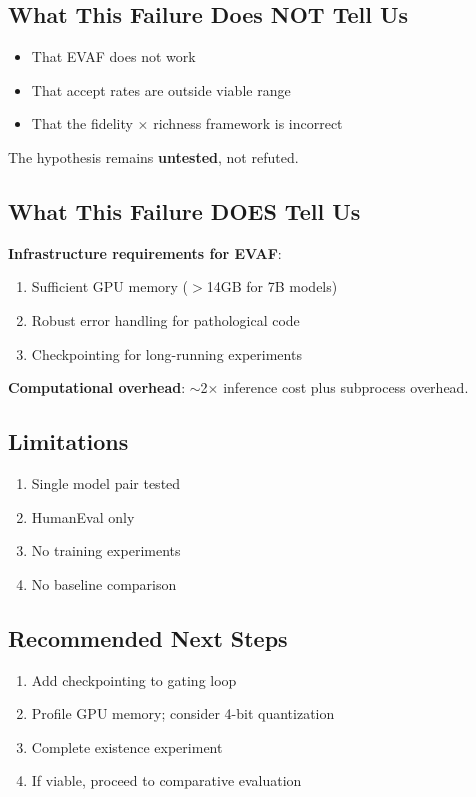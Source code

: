
\subsection{What This Failure Does NOT Tell Us}

\begin{itemize}
    \item That EVAF does not work
    \item That accept rates are outside viable range
    \item That the fidelity $\times$ richness framework is incorrect
\end{itemize}

The hypothesis remains \textbf{untested}, not refuted.

\subsection{What This Failure DOES Tell Us}

\textbf{Infrastructure requirements for EVAF}:
\begin{enumerate}
    \item Sufficient GPU memory ($>$14GB for 7B models)
    \item Robust error handling for pathological code
    \item Checkpointing for long-running experiments
\end{enumerate}

\textbf{Computational overhead}: $\sim$2$\times$ inference cost plus subprocess overhead.

\subsection{Limitations}

\begin{enumerate}
    \item Single model pair tested
    \item HumanEval only
    \item No training experiments
    \item No baseline comparison
\end{enumerate}

\subsection{Recommended Next Steps}

\begin{enumerate}
    \item Add checkpointing to gating loop
    \item Profile GPU memory; consider 4-bit quantization
    \item Complete existence experiment
    \item If viable, proceed to comparative evaluation
\end{enumerate}
